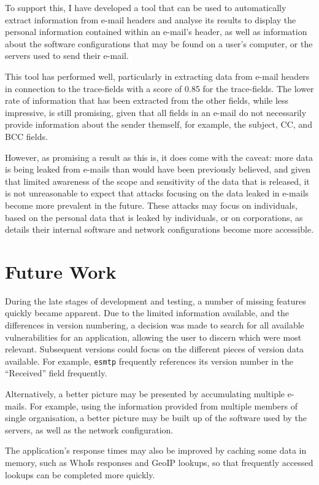 To support this, I have developed a tool that can be used to automatically
extract information from e-mail headers and analyse its results to display the
personal information contained within an e-mail's header, as well as
information about the software configurations that may be found on a user's
computer, or the servers used to send their e-mail.

This tool has performed well, particularly in extracting data from e-mail
headers in connection to the trace-fields with a score of 0.85 for the
trace-fields.  The lower rate of information that has been extracted from
the other fields, while less impressive, is still promising, given that all
fields in an e-mail do not necessarily provide information about the sender
themself, for example, the subject, CC, and BCC fields.

However, as promising a result as this is, it does come with the caveat: more
data is being leaked from e-mails than would have been previously believed, and
given that limited awareness of the scope and sensitivity of the data that is
released, it is not unreasonable to expect that attacks focusing on the data
leaked in e-mails become more prevalent in the future.  These attacks may focus
on individuals, based on the personal data that is leaked by individuals, or on
corporations, as details their internal software and network configurations
become more accessible.

\section{Future Work}

During the late stages of development and testing, a number of missing features
quickly became apparent. Due to the limited information available, and the
differences in version numbering, a decision was made to search for all
available vulnerabilities for an application, allowing the user to discern
which were most relevant.  Subsequent versions could focus on the different
pieces of version data available.  For example, \texttt{esmtp} frequently
references its version number in the ``Received'' field frequently.

Alternatively, a better picture may be presented by accumulating multiple
e-mails. For example, using the information provided from multiple members of
single organisation, a better picture may be built up of the software used by
the servers, as well as the network configuration.

The application's response times may also be improved by caching some data in
memory, such as WhoIs responses and GeoIP lookups, so that frequently accessed
lookups can be completed more quickly.

